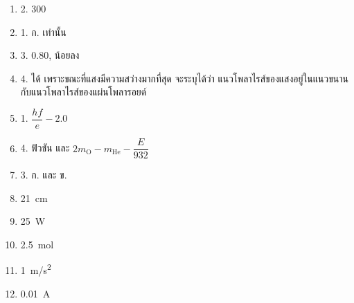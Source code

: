 \documentclass[a4paper, 12pt]{article}
\begin{document}
\begin{enumerate}
    \item 2. 300
    \item 1. ก. เท่านั้น
    \item 3. 0.80, น้อยลง
    \item 4. ได้ เพราะขณะที่แสงมีความสว่างมากที่สุด จะระบุได้ว่า แนวโพลาไรส์ของแสงอยู่ในแนวขนานกับแนวโพลาไรส์ของแผ่นโพลารอยด์
    \item 1. \(\dfrac{hf}{e}-2.0\)
    \item 4. ฟิวชัน และ \(2m_\text{O}-m_\text{He}-\dfrac{E}{932}\)
    \item 3. ก. และ ข.
    \item \SI{21}{cm}
    \item \SI{25}{W}
    \item \SI{2.5}{mol}
    \item \SI{1}{m/s^2}
    \item \SI{0.01}{A}
\end{enumerate}
\end{document}
